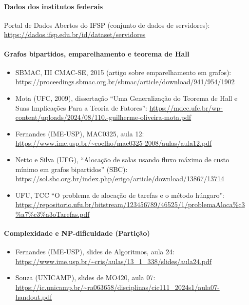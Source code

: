 \documentclass[12pt,a4paper]{article}
\begin{document}
\paragraph{Dados dos institutos federais}

Portal de Dados Abertos do IFSP (conjunto de dados de servidores): \url{https://dados.ifsp.edu.br/id/dataset/servidores}

\paragraph{Grafos bipartidos, emparelhamento e teorema de Hall}
\begin{itemize}
  \item SBMAC, III CMAC-SE, 2015 (artigo sobre emparelhamento em grafos): \url{https://proceedings.sbmac.org.br/sbmac/article/download/941/954/1902}
  \item Mota (UFC, 2009), dissertação ``Uma Generalização do Teorema de Hall e Suas Implicações Para a Teoria de Fatores'': \url{https://mdcc.ufc.br/wp-content/uploads/2024/08/110.-guilherme-oliveira-mota.pdf}
  \item Fernandes (IME-USP), MAC0325, aula 12: \url{https://www.ime.usp.br/~coelho/mac0325-2008/aulas/aula12.pdf}
  \item Netto e Silva (UFG), ``Alocação de salas usando fluxo máximo de custo mínimo em grafos bipartidos'' (SBC): \url{https://sol.sbc.org.br/index.php/erigo/article/download/13867/13714}
  \item UFU, TCC ``O problema de alocação de tarefas e o método húngaro'': \url{https://repositorio.ufu.br/bitstream/123456789/46525/1/problemaAloca%c3%a7%c3%a3oTarefas.pdf}
\end{itemize}

\paragraph{Complexidade e NP-dificuldade (Partição)}
\begin{itemize}
  \item Fernandes (IME-USP), slides de Algoritmos, aula 24: \url{https://www.ime.usp.br/~cris/aulas/13_1_338/slides/aula24.pdf}
  \item Souza (UNICAMP), slides de MO420, aula 07: \url{https://ic.unicamp.br/~ra063658/disciplinas/cic111_2024s1/aula07-handout.pdf}
\end{itemize}
\end{document}
